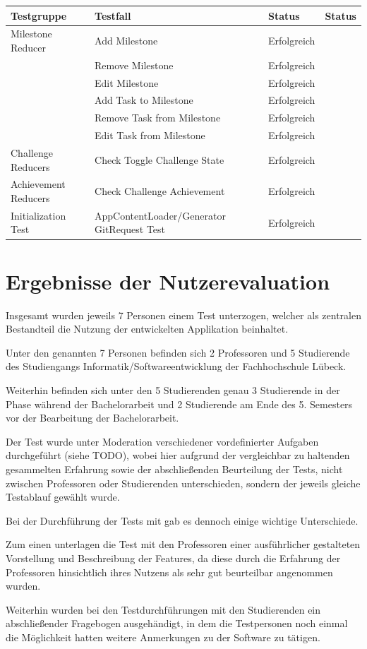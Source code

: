 \documentclass[bibliography=totoc,listof=totoc,BCOR=5mm,DIV=12,oneside]{scrbook}
\begin{document}
\bigskip
\begin{tabularx}{\textwidth}{l|X|l|l}
	\toprule
	\textbf{Testgruppe} & \textbf{Testfall} & \textbf{Status} & \textbf{Status}\\ 
	\midrule
 	Milestone Reducer & Add Milestone & Erfolgreich & \\ 
 	& Remove Milestone & Erfolgreich & \\ 
 	& Edit Milestone & Erfolgreich & \\
 	& Add Task to Milestone & Erfolgreich & \\
 	& Remove Task from Milestone & Erfolgreich & \\
 	& Edit Task from Milestone & Erfolgreich & \\ 
 	\midrule
 	Challenge Reducers & Check Toggle Challenge State & Erfolgreich & \\
 	\midrule
 	Achievement Reducers & Check Challenge Achievement & Erfolgreich & \\
 	\midrule
 	Initialization Test & AppContentLoader/Generator GitRequest Test & Erfolgreich & 
 	\\ 
	\bottomrule
\end{tabularx}
\label{tab:reducertests}

\newpage
\section{Ergebnisse der Nutzerevaluation}
\par Insgesamt wurden jeweils 7 Personen einem Test unterzogen, welcher als zentralen Bestandteil die Nutzung der entwickelten Applikation beinhaltet. 
\par Unter den genannten 7 Personen befinden sich 2 Professoren und 5 Studierende des Studiengangs Informatik/Softwareentwicklung der Fachhochschule Lübeck. 
\par Weiterhin befinden sich unter den 5 Studierenden genau 3 Studierende in der Phase während der Bachelorarbeit und 2 Studierende am Ende des 5. Semesters vor der Bearbeitung der Bachelorarbeit.

\par \bigskip Der Test wurde unter Moderation verschiedener vordefinierter Aufgaben durchgeführt (siehe TODO), wobei hier aufgrund der vergleichbar zu haltenden gesammelten Erfahrung sowie der abschließenden Beurteilung der Tests, nicht zwischen Professoren oder Studierenden unterschieden, sondern der jeweils gleiche Testablauf gewählt wurde.
\par \bigskip Bei der Durchführung der Tests mit gab es dennoch einige wichtige Unterschiede. 
\par Zum einen unterlagen die Test mit den Professoren einer ausführlicher gestalteten Vorstellung und Beschreibung der Features, da diese durch die Erfahrung der Professoren hinsichtlich ihres Nutzens als sehr gut beurteilbar angenommen wurden.
\par Weiterhin wurden bei den Testdurchführungen mit den Studierenden ein abschließender Fragebogen ausgehändigt, in dem die Testpersonen noch einmal die Möglichkeit hatten weitere Anmerkungen zu der Software zu tätigen.
\end{document}
